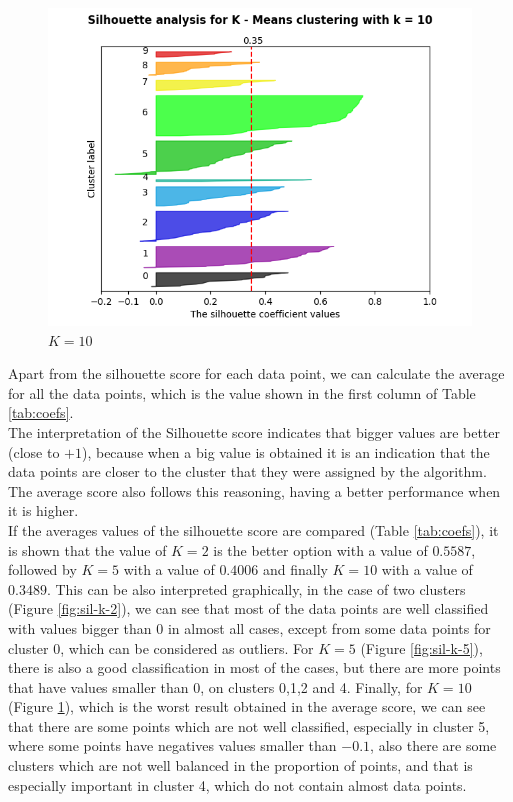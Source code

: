 \documentclass[12pt]{article}
\begin{document}
\begin{figure}[H]
\begin{minipage}{0.32\textwidth}
     \caption{$K = 5$}
     \label{fig:sil-k-5}
   \end{minipage}
   \begin{minipage}{0.32\textwidth}
     \centering
     \includegraphics[width=\linewidth]{assignment-1/plots/task-1/silhouette-plot-k-10.png}
     \caption{$K=10$}
     \label{fig:sil-k-10}
   \end{minipage}
\end{figure}

Apart from the silhouette score for each data point, we can calculate the average for all the data points, which is the value shown in the first column of Table \ref{tab:coefs}. \\

The interpretation of the Silhouette score indicates that bigger values are better (close to $+1$), because when a big value is obtained it is an indication that the data points are closer to the cluster that they were assigned by the algorithm. The average score also follows this reasoning, having a better performance when it is higher.\\

If the averages values of the silhouette score are compared (Table \ref{tab:coefs}), it is shown that the value of $K=2$ is the better option with a value of $0.5587$, followed by $K=5$ with a value of $0.4006$ and finally $K=10$ with a value of $0.3489$. This can be also interpreted graphically, in the case of two clusters (Figure \ref{fig:sil-k-2}), we can see that most of the data points are well classified with values bigger than $0$ in almost all cases, except from some data points for cluster 0, which can be considered as outliers. For $K=5$ (Figure \ref{fig:sil-k-5}), there is also a good classification in most of the cases, but there are more points that have values smaller than $0$, on clusters 0,1,2 and 4. Finally, for $K=10$ (Figure \ref{fig:sil-k-10}), which is the worst result obtained in the average score, we can see that there are some points which are not well classified, especially in cluster 5, where some points have negatives values smaller than $-0.1$, also there are some clusters which are not well balanced in the proportion of points, and that is especially important in cluster 4, which do not contain almost data points.
\end{document}
